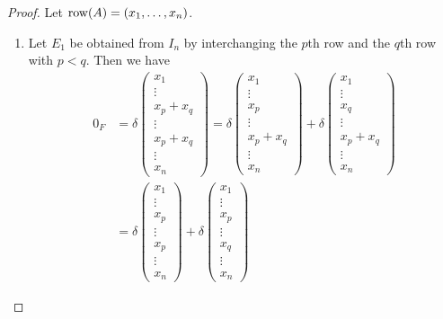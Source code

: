 \begin{proof}
  Let $\operatorname{row}(A) = (x_1, \dots, x_n)$.
  \begin{enumerate}
    \item Let $E_1$ be obtained from $I_n$ by interchanging the $p$th row and
    the $q$th row with $p < q$.
    Then we have
    \begin{align*}
      0_F
      &=
      \delta
      \begin{pmatrix}
        x_1 \\ \vdots \\ x_p + x_q \\ \vdots \\ x_p + x_q \\ \vdots \\ x_n
      \end{pmatrix}
      =
      \delta
      \begin{pmatrix}
        x_1 \\ \vdots \\ x_p \\ \vdots \\ x_p + x_q \\ \vdots \\ x_n
      \end{pmatrix}
      +
      \delta
      \begin{pmatrix}
        x_1 \\ \vdots \\ x_q \\ \vdots \\ x_p + x_q \\ \vdots \\ x_n
      \end{pmatrix} \\
      &=
      \delta
      \begin{pmatrix}
        x_1 \\ \vdots \\ x_p \\ \vdots \\ x_p \\ \vdots \\ x_n
      \end{pmatrix}
      +
      \delta
      \begin{pmatrix}
        x_1 \\ \vdots \\ x_p \\ \vdots \\  x_q \\ \vdots \\ x_n

\end{pmatrix}
\end{align*}
\end{enumerate}
\end{proof}

